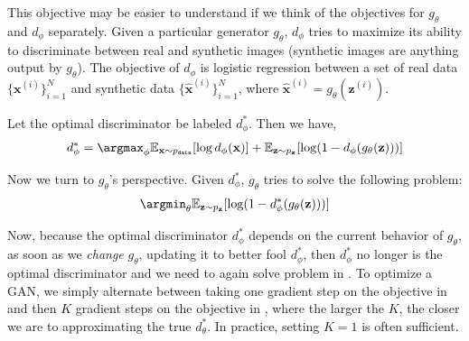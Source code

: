 This objective may be easier to understand if we think of the objectives for $g_{\theta}$ and $d_{\phi}$ separately. Given a particular generator $g_{\theta}$, $d_{\phi}$ tries to maximize its ability to discriminate between real and synthetic images (synthetic images are anything output by $g_{\theta}$). The objective of $d_{\phi}$ is logistic regression between a set of real data $\{\mathbf{x}^{(i)}\}_{i=1}^N$ and synthetic data $\{\hat{\mathbf{x}}^{(i)}\}_{i=1}^N$, where $\hat{\mathbf{x}}^{(i)} = g_{\theta}(\mathbf{z}^{(i)})$.

Let the optimal discriminator be labeled $d_{\phi}^*$. Then we have, 
\begin{align}
    d_{\phi}^* = \argmax_{\phi} \mathbb{E}_{\mathbf{x} \sim p_{\texttt{data}}}[\log d_{\phi}(\mathbf{x})] + \mathbb{E}_{\mathbf{z} \sim p_{\mathbf{z}}}[\log (1-d_{\phi}(g_{\theta}(\mathbf{z})))] \label{eqn:generative_models:GAN_optimal_D}
\end{align}

Now we turn to $g_{\theta}$'s perspective. Given $d_{\phi}^*$, $g_{\theta}$ tries to solve the following problem:
\begin{align}
    \argmin_{\theta} \mathbb{E}_{\mathbf{z} \sim p_{\mathbf{z}}}[\log (1-d_{\phi}^*(g_{\theta}(\mathbf{z})))] \label{eqn:generative_models:GAN_optimal_G}
\end{align}

Now, because the optimal discriminator $d_{\phi}^*$ depends on the current behavior of $g_{\theta}$, as soon as we \textit{change} $g_{\theta}$, updating it to better fool $d_{\phi}^*$, then $d_{\phi}^*$ no longer is the optimal discriminator and we need to again solve problem in \eqn{\ref{eqn:generative_models:GAN_optimal_D}}. To optimize a GAN, we simply alternate between taking one gradient step on the objective in \eqn{\ref{eqn:generative_models:GAN_optimal_G}} and then $K$ gradient steps on the objective in \eqn{\ref{eqn:generative_models:GAN_optimal_D}}, where the larger the $K$, the closer we are to approximating the true $d_{\theta}^*$. In practice, setting $K=1$ is often sufficient.



